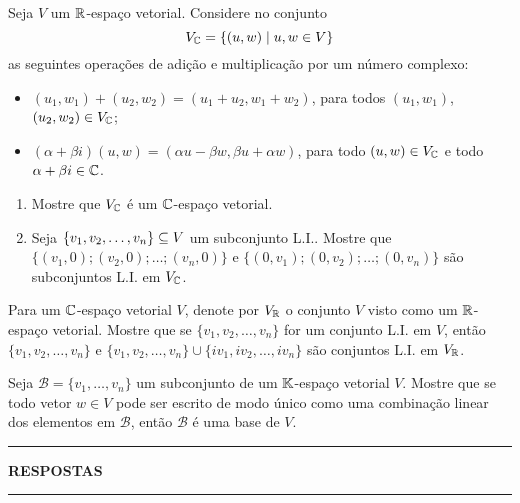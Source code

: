 \documentclass[12pt]{exam}
\begin{document}
\begin{exercicio}
  Seja $V$ um $\mathbb{R}$-espa\c{c}o vetorial. Considere no conjunto
  \[
    V_{\mathbb{C}} = \{(u,w) \mid u, w \in V\}
  \]
  as seguintes opera\c{c}\~oes de adi\c{c}\~ao e multiplica\c{c}\~ao por um n\'umero complexo:
  \begin{itemize}
    \item $(u_1, w_1) + (u_2, w_2) = (u_1 + u_2, w_1 + w_2)$, para todos $(u_1, w_1)$, $(u_2, w_2) \in V_{\mathbb{C}}$;
    \item $(\alpha + \beta i)(u, w) = (\alpha u - \beta w, \beta u + \alpha w)$, para todo $(u, w) \in V_{\mathbb{C}}$ e todo $\alpha + \beta i \in \mathbb{C}$.
  \end{itemize}
  \begin{enumerate}[label={\alph*})]
    \item Mostre que $V_{\mathbb{C}}$ \'e um $\mathbb{C}$-espa\c{c}o vetorial.
    \item Seja $\{v_1, v_2, \dots, v_n\} \subseteq V$ um subconjunto L.I.. Mostre que $\{(v_1,0); (v_2,0); \dots; (v_n, 0)\}$ e $\{(0, v_1); (0, v_2); \dots; (0, v_n)\}$ s\~ao subconjuntos L.I. em $V_{\mathbb{C}}$.
  \end{enumerate}
\end{exercicio}

\begin{exercicio}
  Para um $\mathbb{C}$-espa\c{c}o vetorial $V$, denote por $V_{\mathbb{R}}$ o conjunto $V$ visto como um $\mathbb{R}$-espa\c{c}o  vetorial. Mostre que se $\{v_1, v_2, \dots, v_n\}$ for um conjunto L.I. em $V$, ent\~ao $\{v_1, v_2, \dots, v_n\}$ e $\{v_1, v_2, \dots, v_n\} \cup \{iv_1, iv_2, \dots, iv_n\}$ s\~ao conjuntos L.I. em $V_{\mathbb{R}}$.
\end{exercicio}

\begin{exercicio}
  Seja $\mathcal{B} = \{v_1, \ldots, v_n\}$ um subconjunto de um $\mathbb{K}$-espa\c{c}o vetorial $V$. Mostre que se todo vetor $w \in V$ pode ser escrito de modo \'unico como uma combina\c{c}\~ao linear dos elementos em $\mathcal{B}$, ent\~ao $\mathcal{B}$ \'e uma base de $V$.
\end{exercicio}


\newpage
{}
\hrule
\begin{center}
{\large\bf RESPOSTAS}
\end{center}
\hrule

\end{document}
